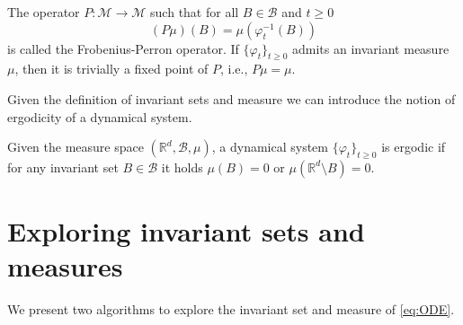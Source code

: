 \documentclass{siamart1116}
\numberwithin{theorem}{section}
\renewcommand{\phi}{\varphi}
\newcommand{\R}{\mathbb{R}}
\newcommand{\Borel}{\mathcal{B}}
\begin{document}
\begin{definition} The operator $P\colon\mathcal{M}\to\mathcal{M}$ such that for all $B \in \Borel$ and $t \geq 0$
	\begin{equation}
		(P\mu)(B) = \mu(\phi^{-1}_t(B))
	\end{equation}
	is called the Frobenius-Perron operator. If $\{\phi_t\}_{t\geq 0}$ admits an invariant measure $\mu$, then it is trivially a fixed point of $P$, i.e., $P\mu = \mu$. 
\end{definition}
Given the definition of invariant sets and measure we can introduce the notion of ergodicity of a dynamical system.
\begin{definition} Given the measure space $(\R^d, \Borel, \mu)$, a dynamical system $\{\phi_t\}_{t\geq 0}$ is ergodic if for any invariant set $B \in \Borel$ it holds $\mu(B) = 0$ or $\mu(\R^d \setminus B) = 0$.
\end{definition}

\section{Exploring invariant sets and measures} We present two algorithms to explore the invariant set and measure of \eqref{eq:ODE}.
\end{document}
